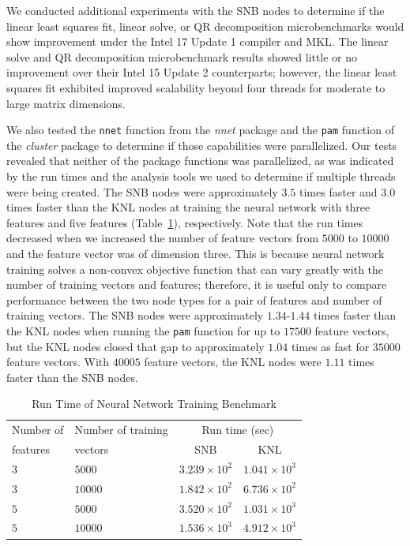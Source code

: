 We conducted additional experiments with the SNB nodes to determine if the linear least
squares fit, linear solve, or QR decomposition microbenchmarks would show improvement
under the Intel 17 Update 1 compiler and MKL. The linear solve and QR decomposition
microbenchmark results showed little or no improvement over their Intel 15 Update 2
counterparts; however, the linear least squares fit exhibited improved scalability beyond
four threads for moderate to large matrix dimensions.

We also tested the \texttt{nnet} function from the \textit{nnet} package and the
\texttt{pam} function of the \textit{cluster} package to determine if those capabilities
were parallelized. Our tests revealed that neither of the package functions was
parallelized, as was indicated by the run times and the analysis tools we used to
determine if multiple threads were being created. The SNB nodes were approximately $3.5$
times faster and $3.0$ times faster than the KNL nodes at training the neural network with
three features and five features (Table~\ref{tab:nnetResults}), respectively. Note that
the run times decreased when we increased the number of feature vectors from $5000$ to
$10000$ and the feature vector was of dimension three. This is because neural network
training solves a non-convex objective function that can vary greatly with the number of
training vectors and features; therefore, it is useful only to compare performance between
the two node types for a pair of features and number of training vectors. The SNB nodes
were approximately $1.34$-$1.44$ times faster than the KNL nodes when running the
\texttt{pam} function for up to $17500$ feature vectors, but the KNL nodes closed that gap
to approximately $1.04$ times as fast for $35000$ feature vectors. With $40005$ feature
vectors, the KNL nodes were $1.11$ times faster than the SNB nodes.

\begin{table}
  \caption{Run Time of Neural Network Training Benchmark}
  \label{tab:nnetResults}
  \begin{tabular}{llcc}
    \toprule
      Number of & Number of training & \multicolumn{2}{c}{Run time (sec)}\\
      features  & vectors            & SNB & KNL\\
    \midrule
    $3$ & $5000$  & $3.239\times 10^{2}$ & $1.041\times 10^{3}$ \\ %
    $3$ & $10000$ & $1.842\times 10^{2}$ & $6.736\times 10^{2}$ \\ %
    $5$ & $5000$  & $3.520\times 10^{2}$ & $1.031\times 10^{3}$ \\ %
    $5$ & $10000$ & $1.536\times 10^{3}$ & $4.912\times 10^{3}$ \\ %
    \bottomrule
  \end{tabular}
\end{table}

